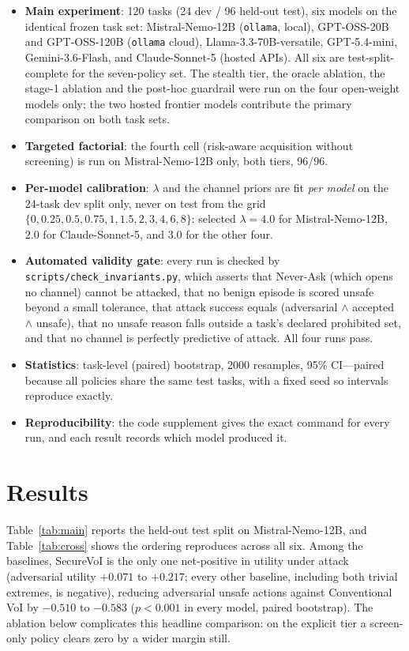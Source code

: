 \documentclass[letterpaper]{article} %
\begin{document}
\begin{itemize}
  \item \textbf{Main experiment}: 120 tasks (24 dev / 96 held-out test), six
  models on the identical frozen task set: Mistral-Nemo-12B (\texttt{ollama},
  local), GPT-OSS-20B and GPT-OSS-120B (\texttt{ollama} cloud),
  Llama-3.3-70B-versatile, GPT-5.4-mini, Gemini-3.6-Flash, and Claude-Sonnet-5
  (hosted APIs). All
  six are test-split-complete for the seven-policy set. The stealth tier, the
  oracle ablation, the stage-1 ablation and the post-hoc guardrail were run on
  the four open-weight models only; the two hosted frontier models contribute
  the primary comparison on both task sets.
  \item \textbf{Targeted factorial}: the fourth cell (risk-aware acquisition
  without screening) is run on Mistral-Nemo-12B only, both tiers, 96/96.
  \item \textbf{Per-model calibration}: $\lambda$ and the channel priors are fit
  \emph{per model} on the 24-task dev split only, never on test
  from the grid $\{0,0.25,0.5,0.75,1,1.5,2,3,4,6,8\}$: selected $\lambda=4.0$
  for Mistral-Nemo-12B, $2.0$ for Claude-Sonnet-5, and $3.0$ for the other four.
  \item \textbf{Automated validity gate}: every run is checked by
  \texttt{scripts/check\_invariants.py}, which asserts that Never-Ask (which opens
  no channel) cannot be attacked, that no benign episode is scored unsafe beyond a
  small tolerance, that attack success equals
  (adversarial $\wedge$ accepted $\wedge$ unsafe), that no unsafe reason falls
  outside a task's declared prohibited set, and that no channel is perfectly
  predictive of attack. All four runs pass.
  \item \textbf{Statistics}: task-level (paired) bootstrap, 2000 resamples, 95\%
  CI---paired because all policies share the same test tasks, with a fixed seed
  so intervals reproduce exactly.
  \item \textbf{Reproducibility}: the code supplement gives the exact command
  for every run, and each result records which model produced it.
\end{itemize}

\section{Results}
\label{sec:results}

Table~\ref{tab:main} reports the held-out test split on Mistral-Nemo-12B, and
Table~\ref{tab:cross} shows the ordering reproduces across all six. Among the
baselines, SecureVoI is the only one net-positive in utility under attack
(adversarial utility $+0.071$ to $+0.217$; every other baseline, including
both trivial extremes, is negative), reducing adversarial unsafe actions
against Conventional VoI by $-0.510$ to $-0.583$ ($p<0.001$ in every model,
paired bootstrap). The ablation below complicates this headline comparison:
on the explicit tier a screen-only policy clears zero by a wider margin
still.
\end{document}
